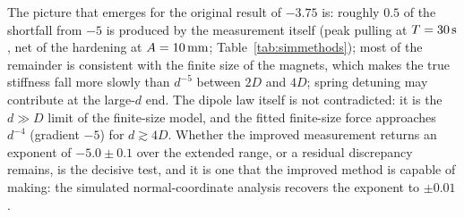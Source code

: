 The picture that emerges for the original result of $-3.75$ is: roughly $0.5$ of the shortfall from $-5$ is produced by the measurement itself (peak pulling at $T=30\,\mathrm{s}$, net of the hardening at $A=10\,\mathrm{mm}$; Table~\ref{tab:simmethods}); most of the remainder is consistent with the finite size of the magnets, which makes the true stiffness fall more slowly than $d^{-5}$ between $2D$ and $4D$; spring detuning may contribute at the large-$d$ end. The dipole law itself is not contradicted: it is the $d\gg D$ limit of the finite-size model, and the fitted finite-size force approaches $d^{-4}$ (gradient $-5$) for $d\gtrsim4D$. Whether the improved measurement returns an exponent of $-5.0\pm0.1$ over the extended range, or a residual discrepancy remains, is the decisive test, and it is one that the improved method is capable of making: the simulated normal-coordinate analysis recovers the exponent to $\pm0.01$.
